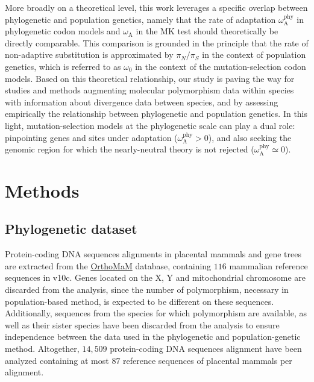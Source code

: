 \documentclass{article}
\newcommand{\rateApop}{\omega_{\mathrm{A}}}
\newcommand{\rateAphy}{\rateApop^{\mathrm{phy}}}
\newcommand{\pn}{\pi_N}
\newcommand{\ps}{\pi_S}
\newcommand{\pnps}{\pn / \ps}
\begin{document}
    More broadly on a theoretical level, this work leverages a specific overlap between phylogenetic and population genetics, namely that the rate of adaptation $\rateAphy$ in phylogenetic codon models and $\rateApop$ in the MK test should theoretically be directly comparable.
    This comparison is grounded in the principle that the rate of non-adaptive substitution is approximated by $\pnps$ in the context of population genetics, which is referred to as $\omega_{0}$ in the context of the mutation-selection codon models.
    Based on this theoretical relationship, our study is paving the way for studies and methods augmenting molecular polymorphism data within species with information about divergence data between species\cite{chen_hunting_2021}, and by assessing empirically the relationship between phylogenetic and population genetics\cite{thorne_codon_2012}.
    In this light, mutation-selection models at the phylogenetic scale can play a dual role: pinpointing genes and sites under adaptation ($\rateAphy > 0$), and also seeking the genomic region for which the nearly-neutral theory is not rejected ($\rateAphy \simeq 0$).

    \section*{Methods}\label{sec:methods}

    \subsection*{Phylogenetic dataset}
    Protein-coding DNA sequences alignments in placental mammals and gene trees are extracted from the \href{https://www.orthomam.univ-montp2.fr}{OrthoMaM} database, containing $116$ mammalian reference sequences in v10c\cite{ranwez_orthomam_2007, douzery_orthomam_2014, scornavacca_orthomam_2019}.
    Genes located on the X, Y and mitochondrial chromosome are discarded from the analysis, since the number of polymorphism, necessary in population-based method, is expected to be different on these sequences.
    Additionally, sequences from the species for which polymorphism are available, as well as their sister species have been discarded from the analysis to ensure independence between the data used in the phylogenetic and population-genetic method.
    Altogether, $14,509$ protein-coding DNA sequences alignment have been analyzed containing at most $87$ reference sequences of placental mammals per alignment.
\end{document}
